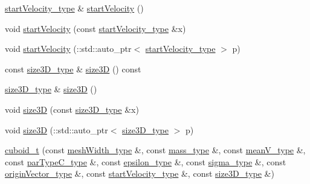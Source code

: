 \begin{DoxyCompactItemize}
\item 
\hyperlink{classcuboid__t_a7b9bd2a7888abc4b08f6f4e91ac9a81f}{start\-Velocity\-\_\-type} \& \hyperlink{classcuboid__t_a985354621466cf976351d5ae91c8e54d}{start\-Velocity} ()
\item 
void \hyperlink{classcuboid__t_a7fd31641814ea206932d025a8b1c30ca}{start\-Velocity} (const \hyperlink{classcuboid__t_a7b9bd2a7888abc4b08f6f4e91ac9a81f}{start\-Velocity\-\_\-type} \&x)
\item 
void \hyperlink{classcuboid__t_a7cacb68eea7d510a128dc8428a11c13b}{start\-Velocity} (\-::std\-::auto\-\_\-ptr$<$ \hyperlink{classcuboid__t_a7b9bd2a7888abc4b08f6f4e91ac9a81f}{start\-Velocity\-\_\-type} $>$ p)
\item 
const \hyperlink{classcuboid__t_abf130ab4ed6d70047bb193a41283ec28}{size3\-D\-\_\-type} \& \hyperlink{classcuboid__t_ad814d59fb91adb1c63a17c41bd37abce}{size3\-D} () const 
\item 
\hyperlink{classcuboid__t_abf130ab4ed6d70047bb193a41283ec28}{size3\-D\-\_\-type} \& \hyperlink{classcuboid__t_ac8a91327ce480ee6c17408cced64cceb}{size3\-D} ()
\item 
void \hyperlink{classcuboid__t_a9a87bc74d77d5acb4d47993fd26bdcc2}{size3\-D} (const \hyperlink{classcuboid__t_abf130ab4ed6d70047bb193a41283ec28}{size3\-D\-\_\-type} \&x)
\item 
void \hyperlink{classcuboid__t_aa26d6df9982c5fa7ca418f577e4e8730}{size3\-D} (\-::std\-::auto\-\_\-ptr$<$ \hyperlink{classcuboid__t_abf130ab4ed6d70047bb193a41283ec28}{size3\-D\-\_\-type} $>$ p)
\item 
\hyperlink{classcuboid__t_addac6142a0729945fd67babbcac59aec}{cuboid\-\_\-t} (const \hyperlink{classcuboid__t_a5759759b1b9e3029ff36c7f20d9213dc}{mesh\-Width\-\_\-type} \&, const \hyperlink{classcuboid__t_a365536fb1db29c6ef0da234297763d61}{mass\-\_\-type} \&, const \hyperlink{classcuboid__t_aea1381b8b1cca3f677ae4a28b29cbe2a}{mean\-V\-\_\-type} \&, const \hyperlink{classcuboid__t_a162caafd069fa127809bb2d573c752c5}{par\-Type\-C\-\_\-type} \&, const \hyperlink{classcuboid__t_ac4a981a7963b1b2105d448cf42ab1230}{epsilon\-\_\-type} \&, const \hyperlink{classcuboid__t_ae1de9c7b1d2b2a9098de31c546c0ff83}{sigma\-\_\-type} \&, const \hyperlink{classcuboid__t_a20d67505efc00dc82947ce881aec1e76}{origin\-Vector\-\_\-type} \&, const \hyperlink{classcuboid__t_a7b9bd2a7888abc4b08f6f4e91ac9a81f}{start\-Velocity\-\_\-type} \&, const \hyperlink{classcuboid__t_abf130ab4ed6d70047bb193a41283ec28}{size3\-D\-\_\-type} \&)
\item 

\end{DoxyCompactItemize}
